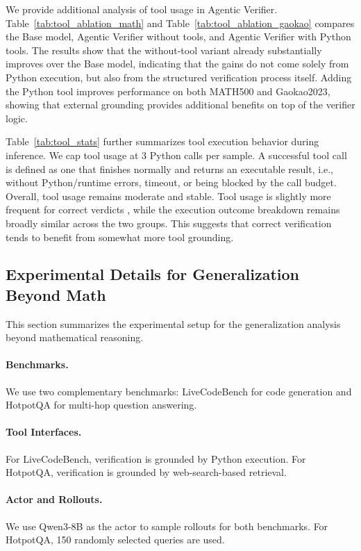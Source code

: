 \documentclass[11pt]{article}
\begin{document}
We provide additional analysis of tool usage in Agentic Verifier. 
Table~\ref{tab:tool_ablation_math} and Table~\ref{tab:tool_ablation_gaokao} compares the Base model, Agentic Verifier without tools, and Agentic Verifier with Python tools. 
The results show that the without-tool variant already substantially improves over the Base model, indicating that the gains do not come solely from Python execution, but also from the structured verification process itself. 
Adding the Python tool improves performance on both MATH500 and Gaokao2023, showing that external grounding provides additional benefits on top of the verifier logic.

Table~\ref{tab:tool_stats} further summarizes tool execution behavior during inference. 
We cap tool usage at 3 Python calls per sample. 
A successful tool call is defined as one that finishes normally and returns an executable result, i.e., without Python/runtime errors, timeout, or being blocked by the call budget. 
Overall, tool usage remains moderate and stable. Tool usage is slightly more frequent for correct verdicts , while the execution outcome breakdown remains broadly similar across the two groups. This suggests that correct verification tends to benefit from somewhat more tool grounding.

\subsection{Experimental Details for Generalization Beyond Math}
\label{sec:beyond_math}
This section summarizes the experimental setup for the generalization analysis beyond mathematical reasoning.

\paragraph{Benchmarks.}
We use two complementary benchmarks: LiveCodeBench for code generation and HotpotQA for multi-hop question answering.

\paragraph{Tool Interfaces.}
For LiveCodeBench, verification is grounded by Python execution.
For HotpotQA, verification is grounded by web-search-based retrieval.

\paragraph{Actor and Rollouts.}
We use Qwen3-8B as the actor to sample rollouts for both benchmarks.
For HotpotQA, 150 randomly selected queries are used.
\end{document}
